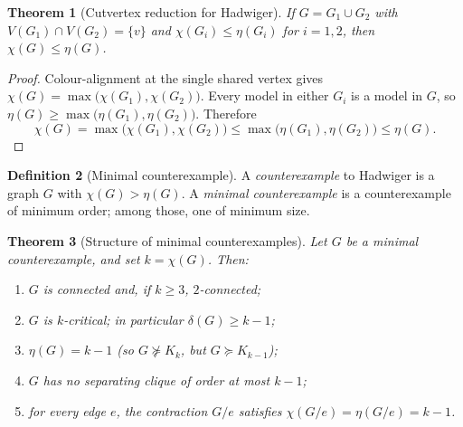 \documentclass[11pt]{article}
\newtheorem{theorem}{Theorem}[section]
\theoremstyle{definition}
\newtheorem{definition}[theorem]{Definition}
\newcommand{\had}{\eta}
\begin{document}
\begin{theorem}[Cutvertex reduction for Hadwiger]\label{thm:cut-had}
If \(G=G_1\cup G_2\) with \(V(G_1)\cap V(G_2)=\{v\}\) and
\(\chi(G_i)\le\had(G_i)\) for \(i=1,2\), then \(\chi(G)\le\had(G)\).
\end{theorem}

\begin{proof}
Colour-alignment at the single shared vertex gives
\(\chi(G)=\max\bigl(\chi(G_1),\chi(G_2)\bigr)\). Every model in either \(G_i\)
is a model in \(G\), so \(\had(G)\ge\max\bigl(\had(G_1),\had(G_2)\bigr)\).
Therefore
\[
\chi(G)=\max\bigl(\chi(G_1),\chi(G_2)\bigr)
\le\max\bigl(\had(G_1),\had(G_2)\bigr)\le\had(G).
\]
\end{proof}

\begin{definition}[Minimal counterexample]
A \emph{counterexample} to Hadwiger is a graph \(G\) with \(\chi(G)>\had(G)\).
A \emph{minimal counterexample} is a counterexample of minimum order; among
those, one of minimum size.
\end{definition}

\begin{theorem}[Structure of minimal counterexamples]\label{thm:min-cex}
Let \(G\) be a minimal counterexample, and set \(k=\chi(G)\). Then:
\begin{enumerate}
\item \(G\) is connected and, if \(k\ge 3\), \(2\)-connected;
\item \(G\) is \(k\)-critical; in particular \(\delta(G)\ge k-1\);
\item \(\had(G)=k-1\) (so \(G\not\succcurlyeq K_k\), but \(G\succcurlyeq K_{k-1}\));
\item \(G\) has no separating clique of order at most \(k-1\);
\item for every edge \(e\), the contraction \(G/e\) satisfies
\(\chi(G/e)=\had(G/e)=k-1\).
\end{enumerate}
\end{theorem}
\end{document}
